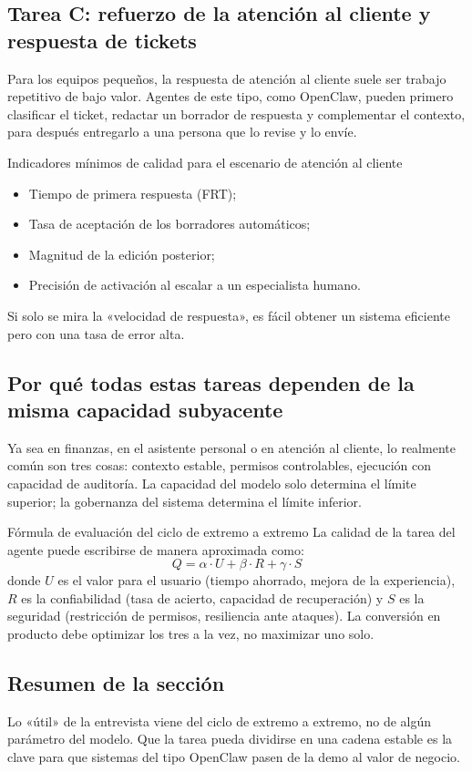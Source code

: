 \subsection{Tarea C: refuerzo de la atención al cliente y respuesta de tickets}

Para los equipos pequeños, la respuesta de atención al cliente suele ser trabajo repetitivo de bajo valor. Agentes de este tipo, como OpenClaw, pueden primero clasificar el ticket, redactar un borrador de respuesta y complementar el contexto, para después entregarlo a una persona que lo revise y lo envíe.

\begin{knowledgebox}{Indicadores mínimos de calidad para el escenario de atención al cliente}
\begin{itemize}
    \item Tiempo de primera respuesta (FRT);
    \item Tasa de aceptación de los borradores automáticos;
    \item Magnitud de la edición posterior;
    \item Precisión de activación al escalar a un especialista humano.
\end{itemize}
Si solo se mira la «velocidad de respuesta», es fácil obtener un sistema eficiente pero con una tasa de error alta.
\end{knowledgebox}

\subsection{Por qué todas estas tareas dependen de la misma capacidad subyacente}

Ya sea en finanzas, en el asistente personal o en atención al cliente, lo realmente común son tres cosas: contexto estable, permisos controlables, ejecución con capacidad de auditoría. La capacidad del modelo solo determina el límite superior; la gobernanza del sistema determina el límite inferior.

\begin{importantbox}{Fórmula de evaluación del ciclo de extremo a extremo}
La calidad de la tarea del agente puede escribirse de manera aproximada como:
\[
Q = \alpha \cdot U + \beta \cdot R + \gamma \cdot S
\]
donde \(U\) es el valor para el usuario (tiempo ahorrado, mejora de la experiencia), \(R\) es la confiabilidad (tasa de acierto, capacidad de recuperación) y \(S\) es la seguridad (restricción de permisos, resiliencia ante ataques). La conversión en producto debe optimizar los tres a la vez, no maximizar uno solo.
\end{importantbox}

\subsection{Resumen de la sección}
Lo «útil» de la entrevista viene del ciclo de extremo a extremo, no de algún parámetro del modelo. Que la tarea pueda dividirse en una cadena estable es la clave para que sistemas del tipo OpenClaw pasen de la demo al valor de negocio.
